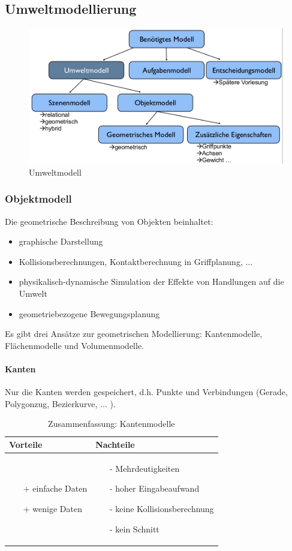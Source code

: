 \subsection{Umweltmodellierung}
\begin{figure}[ht]\centering 
\includegraphics[width=0.6\linewidth]{figures/ch02_umweltmodell.png}
\caption{Umweltmodell}
\label{fig:ch02_um}
\end{figure}

\subsubsection{Objektmodell}
Die geometrische Beschreibung von Objekten beinhaltet:
\begin{itemize}
\setlength\itemsep{0em}
\item graphische Darstellung
\item Kollisionsberechnungen, Kontaktberechnung in Griffplanung, ...
\item physikalisch-dynamische Simulation der Effekte von Handlungen auf die Umwelt
\item geometriebezogene Bewegungsplanung
\end{itemize}
Es gibt drei Ansätze zur geometrischen Modellierung: Kantenmodelle, Flächenmodelle und Volumenmodelle.\\
\paragraph*{Kanten}
Nur die Kanten werden gespeichert, d.h. Punkte und Verbindungen (Gerade, Polygonzug, Bezierkurve, ... ).
\begin{table}[hbt]
\centering
\begin{tabular}{|p{6.5cm}|p{6.5cm}|}
\hline
Vorteile & Nachteile\\
\hline
\vspace{-5mm}
\begin{itemize}
\setlength\itemsep{0em}
\item[+] einfache Daten
\item[+] wenige Daten
\end{itemize}
 &
 \vspace{-5mm}
\begin{itemize}
\setlength\itemsep{0em}
\item[-] Mehrdeutigkeiten
\item[-] hoher Eingabeaufwand
\item[-] keine Kollisionsberechnung
\item[-] kein Schnitt
\end{itemize}\\
\hline
\end{tabular}
\caption{Zusammenfassung: Kantenmodelle}
\label{tab:Kantenmod}
\end{table}\\ 
